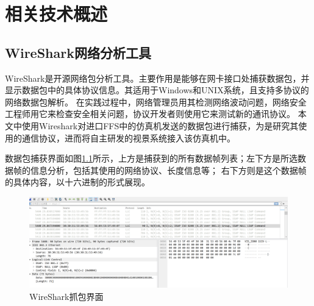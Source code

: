 \chapter{相关技术概述}
\section{WireShark网络分析工具}
WireShark是开源网络包分析工具。主要作用是能够在网卡接口处捕获数据包，并显示数据包中的具体协议信息\cite{wireshark1}。其适用于Windows和UNIX系统，且支持多协议的网络数据包解析。
在实践过程中，网络管理员用其检测网络波动问题，网络安全工程师用它来检查安全相关问题，协议开发者则使用它来测试新的通讯协议\cite{wireshark2}。
本文中使用Wireshark对进口FFS中的仿真机发送的数据包进行捕获，为是研究其使用的通信协议，进而将自主研发的视景系统接入该仿真机中。
\par
数据包捕获界面如图\ref{wireshark}所示，上方是捕获到的所有数据帧列表；左下方是所选数据帧的信息分析，包括其使用的网络协议、长度信息等；
右下方则是这个数据帧的具体内容，以十六进制的形式展现。
\begin{figure}[h!]
    \begin{center}
        \includegraphics[width=\textwidth]{pictures/wireshark.png}
        \caption{WireShark抓包界面}
        \label{wireshark}
    \end{center}
\end{figure}
